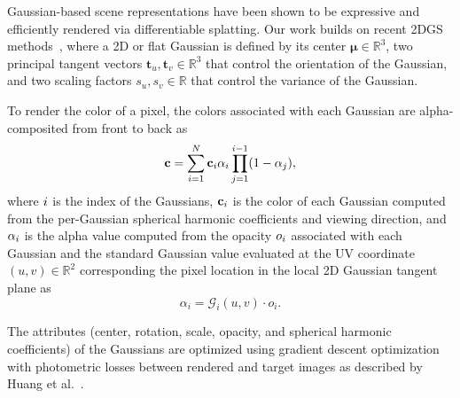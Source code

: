 Gaussian-based scene representations have been shown to be expressive and efficiently rendered via differentiable splatting. Our work builds on recent 2DGS methods~\cite{huang20242d}, where a 2D or flat Gaussian is defined by its center $\bm{\mu} \in \mathbb{R}^3$, two principal tangent vectors $\mathbf{t}_u, \mathbf{t}_v \in \mathbb{R}^3$ that control the orientation of the Gaussian, and two scaling factors $s_u, s_v \in \mathbb{R}$ that control the variance of the Gaussian. 


To render the color of a pixel, the colors associated with each Gaussian are alpha-composited from front to back as
%
\begin{equation}
    \mathbf{c} = \sum_{i=1}^N \mathbf{c}_i \alpha_i \prod_{j=1}^{i-1}(1 - \alpha_j), \label{eq:gs_volume_rendering}
\end{equation}
%
where $i$ is the index of the Gaussians, $\mathbf{c}_i$ is the color of each Gaussian computed from the per-Gaussian spherical harmonic coefficients and viewing direction, and $\alpha_i$ is the alpha value computed from the opacity $o_i$ associated with each Gaussian and the standard Gaussian value  evaluated at the UV coordinate $(u, v) \in \mathbb{R}^2$ corresponding the pixel location in the local 2D Gaussian tangent plane as
%
\begin{equation}
    \alpha_i = \mathcal{G}_i({u, v})\cdot o_i .
    \label{eq:opacity}
\end{equation}


The attributes (center, rotation, scale, opacity, and spherical harmonic coefficients) of the Gaussians are optimized using gradient descent optimization with photometric losses between rendered and target images as described by Huang et al.~.

